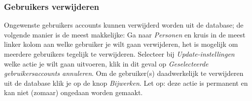 \subsubsection{Gebruikers verwijderen}

Ongewenste gebruikers accounts kunnen verwijderd worden uit de database; de volgende manier is de meest makkelijke:
Ga naar \emph{Personen} en kruis in de meest linker kolom aan welke gebruiker je wilt gaan verwijderen, het is mogelijk om meerdere gebruikers tegelijk te verwijderen. Selecteer bij \emph{Update-instellingen} welke actie je wilt gaan uitvoeren, klik in dit geval op \emph{Geselecteerde gebruikersaccounts annuleren}. Om de gebruiker(s) daadwerkelijk te verwijderen uit de database klik je op de knop \emph{Bijwerken}. Let op: deze actie is permanent en kan niet (zomaar) ongedaan worden gemaakt. 